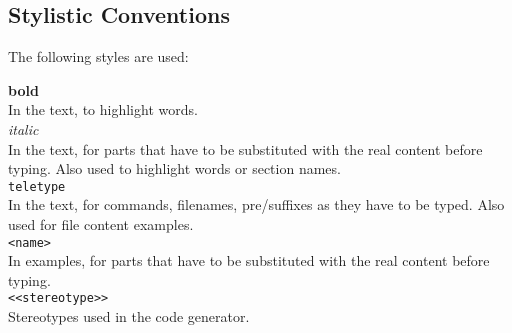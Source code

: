 \subsection{Stylistic Conventions}

The following styles are used:

{\bf bold}\\
\hspace{5cm} In the text, to highlight words.\\

{\it italic}\\
\hspace{5cm} In the text, for parts that have to be substituted
with the real content before typing. Also used to highlight words or section
names.\\

{\tt teletype}\\
\hspace{5cm} In the text, for commands, filenames, pre/suffixes
as they have to be typed. Also used for file content examples.\\

\verb+<name>+\\
\hspace{5cm} In examples, for parts that have to be substituted
with the real content before typing.\\

\verb+<<stereotype>>+\\
\hspace{5cm} Stereotypes used in the code generator.


\newpage
